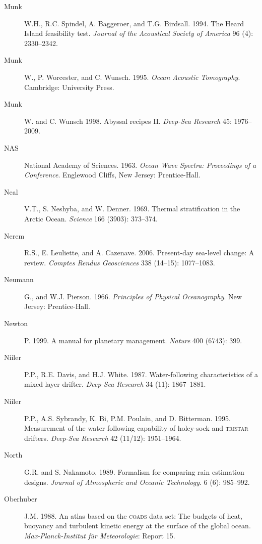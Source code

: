 \begin{description}
\item [Munk]W.H., R.C. Spindel, A. Baggeroer, and T.G. Birdsall. 1994. The
Heard Island feasibility test. \textit{Journal of the Acoustical Society of
America} 96 (4): 2330--2342.

\item [Munk]W., P. Worcester, and C. Wunsch. 1995. \textit{Ocean Acoustic
Tomography}.  Cambridge: University Press.

\item [Munk]W. and C. Wunsch 1998. Abyssal recipes II. \textit{Deep-Sea Research}
45: 1976--2009.

\item [NAS]National Academy of Sciences. 1963. \textit{Ocean Wave Spectra: Proceedings of a Conference}.
Englewood Cliffs, New Jersey: Prentice-Hall.

\item [Neal]V.T., S. Neshyba, and W. Denner. 1969. Thermal
stratification in the Arctic Ocean. \textit{Science} 166 (3903): 373--374.

\item[Nerem]R.S., E. Leuliette, and A. Cazenave. 2006. Present-day sea-level change: A review. \textit{Comptes Rendus Geosciences} 338 (14--15): 1077--1083.
	
\item [Neumann]G., and W.J. Pierson.
1966. \textit{Principles of Physical Oceanography}.  New Jersey: Prentice-Hall.

\item [Newton]P. 1999. A manual for planetary management. \textit{Nature} 400
(6743): 399.

\item [Niiler]P.P., R.E. Davis, and H.J. White. 1987. Water-following
characteristics of a mix\-ed layer drifter. \textit{Deep-Sea Research} 34 (11):
1867--1881.

\item [Niiler]P.P., A.S. Sybrandy, K. Bi, P.M. Poulain, and D. Bitterman. 1995.
Measurement of the water following capability of holey-sock and \textsc{tristar} drifters. \textit{Deep-Sea Research} 42 (11/12): 1951--1964.

\item [North]G.R. and S. Nakamoto. 1989. Formalism for comparing rain estimation designs. \textit{Journal of Atmospheric and Oceanic Technology}. 6 (6): 985--992.

\item [Oberhuber]J.M. 1988. An atlas based on the \textsc{coads} data set:
The budgets of heat, buoyancy and turbulent kinetic energy at the surface of the
global ocean. \textit{Max-Planck-Institut f\"{u}r Meteorologie}: Report 15.


\end{description}
